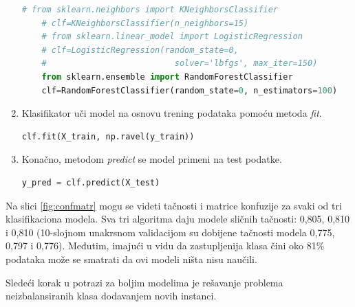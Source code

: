 \documentclass[12pt,oneside]{memoir}
\begin{document}
\begin{enumerate}
\begin{lstlisting}[language=Python, basicstyle=\tiny]
	# from sklearn.neighbors import KNeighborsClassifier
	# clf=KNeighborsClassifier(n_neighbors=15)
	# from sklearn.linear_model import LogisticRegression
	# clf=LogisticRegression(random_state=0, 
	#                          solver='lbfgs', max_iter=150)
	from sklearn.ensemble import RandomForestClassifier
	clf=RandomForestClassifier(random_state=0, n_estimators=100)
\end{lstlisting}

\item Klasifikator uči model na osnovu trening podataka pomoću metoda \textit{fit}. 
\begin{lstlisting}[language=Python, basicstyle=\tiny]
	clf.fit(X_train, np.ravel(y_train))
\end{lstlisting}

\item Konačno, metodom \textit{predict} se model primeni na test podatke.
\begin{lstlisting}[language=Python, basicstyle=\tiny]
	y_pred = clf.predict(X_test)
\end{lstlisting}

\end{enumerate}

Na slici \ref{fig:confmatr} mogu se videti tačnosti i matrice konfuzije za svaki od tri klasifikaciona modela. Sva tri algoritma daju modele sličnih tačnosti: 0,805, 0,810 i 0,810 (10-slojnom unakrsnom validacijom su dobijene tačnosti modela 0,775, 0,797 i 0,776). Međutim, imajući u vidu da zastupljenija klasa čini oko 81\% podataka može se smatrati da ovi modeli ništa nisu naučili. %

Sledeći korak u potrazi za boljim modelima je rešavanje problema neizbalansiranih klasa dodavanjem novih instanci. 
\end{document}
